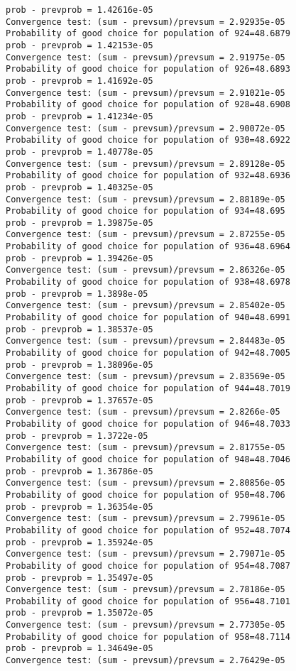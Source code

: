 \documentclass[11pt,onecolumn]{article}
\begin{document}
\begin{verbatim}
prob - prevprob = 1.42616e-05
Convergence test: (sum - prevsum)/prevsum = 2.92935e-05
Probability of good choice for population of 924=48.6879
prob - prevprob = 1.42153e-05
Convergence test: (sum - prevsum)/prevsum = 2.91975e-05
Probability of good choice for population of 926=48.6893
prob - prevprob = 1.41692e-05
Convergence test: (sum - prevsum)/prevsum = 2.91021e-05
Probability of good choice for population of 928=48.6908
prob - prevprob = 1.41234e-05
Convergence test: (sum - prevsum)/prevsum = 2.90072e-05
Probability of good choice for population of 930=48.6922
prob - prevprob = 1.40778e-05
Convergence test: (sum - prevsum)/prevsum = 2.89128e-05
Probability of good choice for population of 932=48.6936
prob - prevprob = 1.40325e-05
Convergence test: (sum - prevsum)/prevsum = 2.88189e-05
Probability of good choice for population of 934=48.695
prob - prevprob = 1.39875e-05
Convergence test: (sum - prevsum)/prevsum = 2.87255e-05
Probability of good choice for population of 936=48.6964
prob - prevprob = 1.39426e-05
Convergence test: (sum - prevsum)/prevsum = 2.86326e-05
Probability of good choice for population of 938=48.6978
prob - prevprob = 1.3898e-05
Convergence test: (sum - prevsum)/prevsum = 2.85402e-05
Probability of good choice for population of 940=48.6991
prob - prevprob = 1.38537e-05
Convergence test: (sum - prevsum)/prevsum = 2.84483e-05
Probability of good choice for population of 942=48.7005
prob - prevprob = 1.38096e-05
Convergence test: (sum - prevsum)/prevsum = 2.83569e-05
Probability of good choice for population of 944=48.7019
prob - prevprob = 1.37657e-05
Convergence test: (sum - prevsum)/prevsum = 2.8266e-05
Probability of good choice for population of 946=48.7033
prob - prevprob = 1.3722e-05
Convergence test: (sum - prevsum)/prevsum = 2.81755e-05
Probability of good choice for population of 948=48.7046
prob - prevprob = 1.36786e-05
Convergence test: (sum - prevsum)/prevsum = 2.80856e-05
Probability of good choice for population of 950=48.706
prob - prevprob = 1.36354e-05
Convergence test: (sum - prevsum)/prevsum = 2.79961e-05
Probability of good choice for population of 952=48.7074
prob - prevprob = 1.35924e-05
Convergence test: (sum - prevsum)/prevsum = 2.79071e-05
Probability of good choice for population of 954=48.7087
prob - prevprob = 1.35497e-05
Convergence test: (sum - prevsum)/prevsum = 2.78186e-05
Probability of good choice for population of 956=48.7101
prob - prevprob = 1.35072e-05
Convergence test: (sum - prevsum)/prevsum = 2.77305e-05
Probability of good choice for population of 958=48.7114
prob - prevprob = 1.34649e-05
Convergence test: (sum - prevsum)/prevsum = 2.76429e-05

\end{verbatim}
\end{document}
